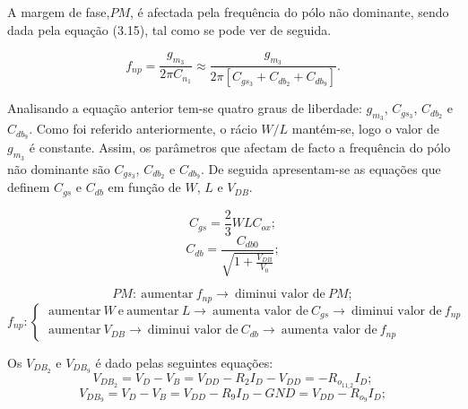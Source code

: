 \documentclass[11pt]{article}
\numberwithin{equation}{section}
\begin{document}
A margem de fase,$PM$, é afectada pela frequência do pólo não dominante, sendo dada pela equação (3.15), tal como se pode ver de seguida.

\vspace{-3mm}
\begin{equation}
f_{np} = \frac{g_{m_3}}{2\pi C_{n_1}} \approx \frac{g_{m_3}}{2\pi \left[C_{gs_3} + C_{db_2} + C_{db_9}\right]}.
\end{equation}

\vspace{1mm}
Analisando a equação anterior tem-se quatro graus de liberdade: $g_{m_3}$, $C_{gs_3}$, $C_{db_2}$ e $C_{db_9}$. Como foi referido anteriormente, o rácio $W/L$ mantém-se, logo o valor de $g_{m_3}$ é constante. Assim, os parâmetros que afectam de facto a frequência do pólo não dominante são $C_{gs_3}$, $C_{db_2}$ e $C_{db_9}$. De seguida apresentam-se as equações que definem $C_{gs}$ e $C_{db}$ em função de $W$, $L$ e $V_{DB}$.

\vspace{-3mm}
\begin{equation}
C_{gs} = \frac{2}{3} W L C_{ox};
\end{equation}
\vspace{-2mm}
\begin{equation}
C_{db} = \frac{C_{db0}}{\sqrt{1 + \frac{V_{DB}}{V_0}}};
\end{equation}
	
\vspace{1mm}

\begin{equation}
	PM: ~\text{aumentar}~f_{np}\rightarrow~\text{diminui valor de}~PM;
\end{equation}
\begin{equation}
f_{np}:  \begin{cases} ~\text{aumentar}~W~\text{e}~\text{aumentar}~L \rightarrow~\text{aumenta valor de}~C_{gs} \rightarrow~\text{diminui valor de}~f_{np} \\ ~\text{aumentar}~V_{DB} \rightarrow~\text{diminui valor de}~C_{db} \rightarrow~\text{aumenta valor de}~f_{np}\end{cases}
\end{equation}

Os $V_{DB_2}$ e $V_{DB_9}$ é dado pelas seguintes equações:
	\vspace{-3mm}
	\begin{equation}
	V_{DB_2} = V_D - V_B = V_{DD} - R_{2} I_D - V_{DD} = - R_{o_{11\_2}} I_D ;
	\end{equation}
	\vspace{-3mm}
	\begin{equation}
	V_{DB_9} = V_D - V_B = V_{DD} - R_{9} I_D - GND = V_{DD} - R_{o_9} I_D ;
	\end{equation}
	
\end{document}
